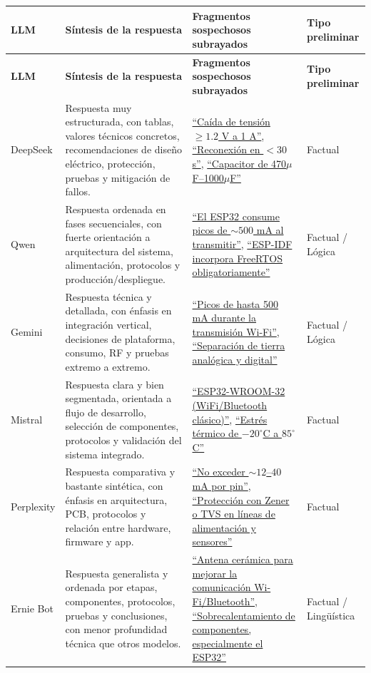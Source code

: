 \documentclass[11pt,a4paper]{article}
\begin{document}
\setlength{\LTleft}{0pt}
\setlength{\LTright}{0pt}
\renewcommand{\arraystretch}{1.08}
\scriptsize
\begin{longtable}{|P{1.9cm}|P{4.4cm}|P{5.2cm}|P{2.2cm}|}
\hline
\textbf{LLM} & \textbf{Síntesis de la respuesta} & \textbf{Fragmentos sospechosos subrayados} & \textbf{Tipo preliminar} \\
\hline
\endfirsthead
\hline
\textbf{LLM} & \textbf{Síntesis de la respuesta} & \textbf{Fragmentos sospechosos subrayados} & \textbf{Tipo preliminar} \\
\hline
\endhead

DeepSeek &
Respuesta muy estructurada, con tablas, valores técnicos concretos, recomendaciones de diseño eléctrico, protección, pruebas y mitigación de fallos. &
\uline{``Caída de tensión $\geq 1.2$ V a 1 A''}, \uline{``Reconexión en $<30$ s''}, \uline{``Capacitor de 470$\mu$F--1000$\mu$F''} &
Factual \\
\hline

Qwen &
Respuesta ordenada en fases secuenciales, con fuerte orientación a arquitectura del sistema, alimentación, protocolos y producción/despliegue. &
\uline{``El ESP32 consume picos de $\sim 500$ mA al transmitir''}, \uline{``ESP-IDF incorpora FreeRTOS obligatoriamente''} &
Factual / Lógica \\
\hline

Gemini &
Respuesta técnica y detallada, con énfasis en integración vertical, decisiones de plataforma, consumo, RF y pruebas extremo a extremo. &
\uline{``Picos de hasta 500 mA durante la transmisión Wi-Fi''}, \uline{``Separación de tierra analógica y digital''} &
Factual / Lógica \\
\hline

Mistral &
Respuesta clara y bien segmentada, orientada a flujo de desarrollo, selección de componentes, protocolos y validación del sistema integrado. &
\uline{``ESP32-WROOM-32 (WiFi/Bluetooth clásico)''}, \uline{``Estrés térmico de $-20^\circ$C a $85^\circ$C''} &
Factual \\
\hline

Perplexity &
Respuesta comparativa y bastante sintética, con énfasis en arquitectura, PCB, protocolos y relación entre hardware, firmware y app. &
\uline{``No exceder $\sim 12$--$40$ mA por pin''}, \uline{``Protección con Zener o TVS en líneas de alimentación y sensores''} &
Factual \\
\hline

Ernie Bot &
Respuesta generalista y ordenada por etapas, componentes, protocolos, pruebas y conclusiones, con menor profundidad técnica que otros modelos. &
\uline{``Antena cerámica para mejorar la comunicación Wi-Fi/Bluetooth''}, \uline{``Sobrecalentamiento de componentes, especialmente el ESP32''} &
Factual / Lingüística \\
\hline


\end{longtable}
\end{document}

